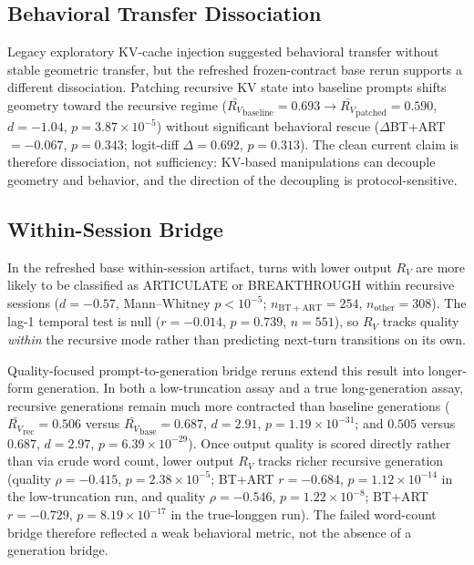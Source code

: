\documentclass{article}
\newcommand{\RV}{R_V}
\newcommand{\dcohen}{d}
\begin{document}
\subsection{Behavioral Transfer Dissociation}
\label{sec:dissoc_behavioral}

Legacy exploratory KV-cache injection suggested behavioral transfer without stable geometric
transfer, but the refreshed frozen-contract base rerun supports a different dissociation.
Patching recursive KV state into baseline prompts shifts geometry toward the recursive regime
($\bar{\RV}_\mathrm{baseline} = 0.693 \to \bar{\RV}_\mathrm{patched} = 0.590$,
$\dcohen = -1.04$, $p = 3.87 \times 10^{-5}$) without significant behavioral rescue
($\Delta$BT+ART$ = -0.067$, $p = 0.343$; logit-diff $\Delta = 0.692$, $p = 0.313$).
The clean current claim is therefore dissociation, not sufficiency:
KV-based manipulations can decouple geometry and behavior, and the direction of the decoupling is
protocol-sensitive.

\subsection{Within-Session Bridge}
\label{sec:bridge}

In the refreshed base within-session artifact, turns with lower output $\RV$ are more likely to be
classified as ARTICULATE or BREAKTHROUGH within recursive sessions
($\dcohen = -0.57$, Mann--Whitney $p < 10^{-5}$; $n_\mathrm{BT+ART}=254$,
$n_\mathrm{other}=308$).
The lag-1 temporal test is null ($r = -0.014$, $p = 0.739$, $n = 551$), so $\RV$
tracks quality \emph{within} the recursive mode rather than predicting next-turn transitions on its own.

Quality-focused prompt-to-generation bridge reruns extend this result into longer-form generation.
In both a low-truncation assay and a true long-generation assay, recursive generations remain much
more contracted than baseline generations
($\bar{\RV}_\mathrm{rec} = 0.506$ versus $\bar{\RV}_\mathrm{base} = 0.687$, $\dcohen = 2.91$,
$p = 1.19 \times 10^{-31}$; and $0.505$ versus $0.687$, $\dcohen = 2.97$,
$p = 6.39 \times 10^{-29}$).
Once output quality is scored directly rather than via crude word count, lower output $\RV$
tracks richer recursive generation
(quality $\rho = -0.415$, $p = 2.38 \times 10^{-5}$; BT+ART $r = -0.684$,
$p = 1.12 \times 10^{-14}$ in the low-truncation run, and
quality $\rho = -0.546$, $p = 1.22 \times 10^{-8}$; BT+ART $r = -0.729$,
$p = 8.19 \times 10^{-17}$ in the true-longgen run).
The failed word-count bridge therefore reflected a weak behavioral metric, not the absence of a
generation bridge.
\end{document}
